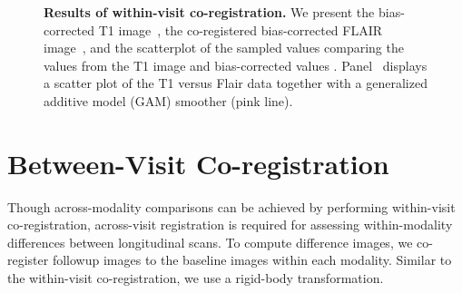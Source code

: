 \documentclass[a4paper]{report}\usepackage[]{graphicx}\usepackage[]{color}
\begin{document}
\begin{article}
\begin{figure}
\hfill
\hfill
\caption{{\bf Results of within-visit co-registration.}  We present the bias-corrected T1 image~\protect{}, the co-registered bias-corrected FLAIR image~\protect{}, and the scatterplot of the sampled values comparing the values from the T1 image and bias-corrected values \protect{}. Panel~\protect{} displays a scatter plot of the T1 versus Flair data together with a generalized additive model (GAM) smoother (pink line).  }
\label{fig:coreg}
\end{figure}


\section{Between-Visit Co-registration}
Though across-modality comparisons can be achieved by performing within-visit co-registration, across-visit registration is required for assessing within-modality differences between longitudinal scans.   To compute difference images, we co-register followup images to the baseline images within each modality.  Similar to the within-visit co-registration, we use a rigid-body transformation.  


\end{article}
\end{document}

